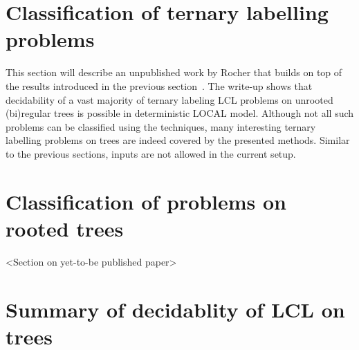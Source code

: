 \section{Classification of ternary labelling problems}

This section will describe an unpublished work by Rocher that builds on top
of the results introduced in the previous section~\cite{Rocher2020doc, Rocher2020clas}.
The write-up shows that decidability of a vast majority of ternary labeling LCL problems on unrooted
(bi)regular trees is possible in deterministic LOCAL model. Although not all such problems
can be classified using the techniques, many interesting ternary labelling problems on trees
are indeed covered by the presented methods.
Similar to the previous sections, inputs are not allowed in the current setup.



\section{Classification of problems on rooted trees}

<Section on yet-to-be published paper>

\section{Summary of decidablity of LCL on trees}

